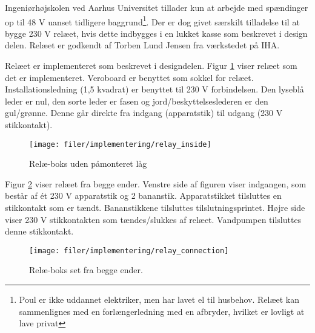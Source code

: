 Ingeniørhøjskolen ved Aarhus Universitet tillader kun at arbejde med spændinger op til 48 V uanset tidligere baggrund\footnote{Poul er ikke uddannet elektriker, men har lavet el til husbehov. Relæet kan sammenlignes med en forlængerledning med en afbryder, hvilket er lovligt at lave privat}. Der er dog givet særskilt tilladelse til at bygge 230 V relæet, hvis dette indbygges i en lukket kasse som beskrevet i design delen. Relæet er godkendt af Torben Lund Jensen fra værkstedet på IHA.

Relæet er implementeret som beskrevet i designdelen. Figur \ref{lab:Relay_inside} viser relæet som det er implementeret. Veroboard er benyttet som sokkel for relæet. Installationsledning (1,5 kvadrat) er benyttet til 230 V forbindelsen.
Den lyseblå leder er nul, den sorte leder er fasen  og jord/beskyttelseslederen er
den gul/grønne. Denne går direkte fra indgang (apparatstik) til udgang (230 V stikkontakt).
  


\begin{figure}[htb]
\centering
{\texttt{[image: filer/implementering/relay\_inside]}}
\caption{Relæ-boks uden påmonteret låg}
\label{lab:Relay_inside}
\end{figure}

Figur \ref{lab:Relay_connection} viser relæet fra begge ender. Venstre side af figuren viser indgangen, som består af ét 230 V apparatstik og 2 bananstik. Apparatstikket tilsluttes en stikkontakt som er tændt. Bananstikkene tilsluttes tilslutningsprintet. Højre side viser 230 V stikkontakten som tændes/slukkes af relæet. Vandpumpen tilsluttes denne stikkontakt.

\begin{figure}[htb]
\centering
{\texttt{[image: filer/implementering/relay\_connection]}}
\caption{Relæ-boks set fra begge ender.}
\label{lab:Relay_connection}
\end{figure}
